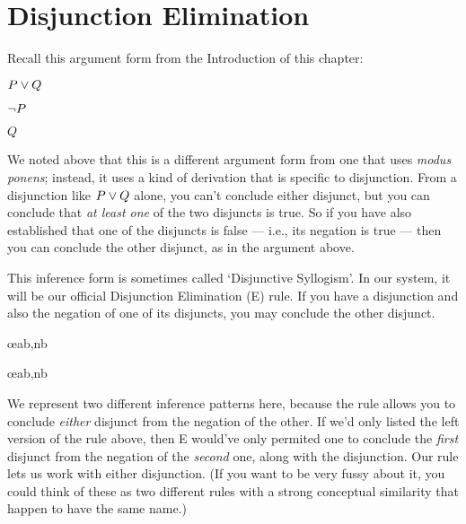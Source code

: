 \section{Disjunction Elimination}

Recall this argument form from the Introduction of this chapter:

\begin{earg}
\item[] $P \vee Q$
\item[] $\neg P$
\item[\therefore] $Q$
\end{earg}

We noted above that this is a different argument form from one that uses \emph{modus ponens}; instead, it uses a kind of derivation that is specific to disjunction. From a disjunction like $P \vee Q$ alone, you can't conclude either disjunct, but you can conclude that \emph{at least one} of the two disjuncts is true. So if you have also established that one of the disjuncts is false --- i.e., its negation is true --- then you can conclude the other disjunct, as in the argument above.

This inference form is sometimes called `Disjunctive Syllogism'. In our system, it will be our official Disjunction Elimination ({\eor}E) rule. If you have a disjunction and also the negation of one of its disjuncts, you may conclude the other disjunct.

\begin{multicols}{2}
\begin{ndproof}
	\metaA{} \oe{ab,nb}
\end{ndproof}

\begin{ndproof}
	\metaB{} \oe{ab,nb}
\end{ndproof}

\end{multicols}

We represent two different inference patterns here, because the rule allows you to conclude \emph{either} disjunct from the negation of the other. If we'd only listed the left version of the rule above, then {\eor}E would've only permited one to conclude the \emph{first} disjunct from the negation of the \emph{second} one, along with the disjunction. Our rule lets us work with either disjunction. (If you want to be very fussy about it, you could think of these as two different rules with a strong conceptual similarity that happen to have the same name.)

